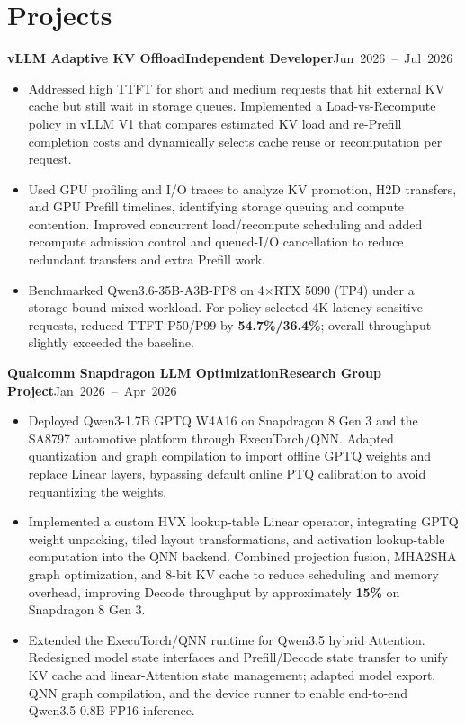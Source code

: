 \documentclass[10pt,a4paper]{article}
\newcommand{\entry}[2]{\par\noindent\textbf{#1}\hfill\mbox{#2}\par}
\begin{document}
\section{Projects}
\entry{vLLM Adaptive KV Offload\hspace{1em}Independent Developer}{Jun 2026 -- Jul 2026}
\begin{itemize}
  \item Addressed high TTFT for short and medium requests that hit external KV cache but still wait in storage
  queues. Implemented a Load-vs-Recompute policy in vLLM V1 that compares estimated KV load and re-Prefill
  completion costs and dynamically selects cache reuse or recomputation per request.
  \item Used GPU profiling and I/O traces to analyze KV promotion, H2D transfers, and GPU Prefill timelines,
  identifying storage queuing and compute contention. Improved concurrent load/recompute scheduling and added
  recompute admission control and queued-I/O cancellation to reduce redundant transfers and extra Prefill work.
  \item Benchmarked Qwen3.6-35B-A3B-FP8 on 4$\times$RTX 5090 (TP4) under a storage-bound mixed workload.
  For policy-selected 4K latency-sensitive requests, reduced TTFT P50/P99 by \textbf{54.7\%/36.4\%};
  overall throughput slightly exceeded the baseline.
\end{itemize}
\entry{Qualcomm Snapdragon LLM Optimization\hspace{1em}Research Group Project}{Jan 2026 -- Apr 2026}
\begin{itemize}
  \item Deployed Qwen3-1.7B GPTQ W4A16 on Snapdragon 8 Gen 3 and the SA8797 automotive platform through
  ExecuTorch/QNN. Adapted quantization and graph compilation to import offline GPTQ weights and replace
  Linear layers, bypassing default online PTQ calibration to avoid requantizing the weights.
  \item Implemented a custom HVX lookup-table Linear operator, integrating GPTQ weight unpacking, tiled
  layout transformations, and activation lookup-table computation into the QNN backend. Combined projection
  fusion, MHA2SHA graph optimization, and 8-bit KV cache to reduce scheduling and memory overhead,
  improving Decode throughput by approximately \textbf{15\%} on Snapdragon 8 Gen 3.
  \item Extended the ExecuTorch/QNN runtime for Qwen3.5 hybrid Attention. Redesigned model state interfaces
  and Prefill/Decode state transfer to unify KV cache and linear-Attention state management; adapted model export,
  QNN graph compilation, and the device runner to enable end-to-end Qwen3.5-0.8B FP16 inference.
\end{itemize}
\end{document}
